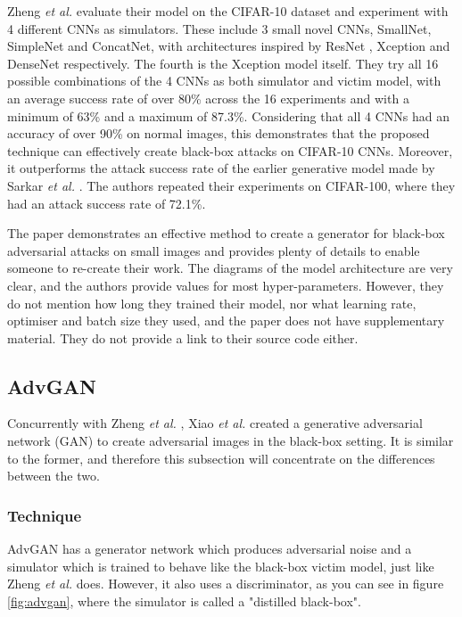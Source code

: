 Zheng \textit{et al.} \cite{zheng_black_box_GAN} evaluate their model on the CIFAR-10 dataset and experiment with 4 different CNNs as simulators. These include 3 small novel CNNs, SmallNet, SimpleNet and ConcatNet, with architectures inspired by ResNet \cite{resnet}, Xception \cite{xception} and DenseNet \cite{densenet} respectively. The fourth is the Xception model \cite{xception} itself. They try all 16 possible combinations of the 4 CNNs as both simulator and victim model, with an average success rate of over 80\% across the 16 experiments and with a minimum of 63\% and a maximum of 87.3\%. Considering that all 4 CNNs had an accuracy of over 90\% on normal images, this demonstrates that the proposed technique can effectively create black-box attacks on CIFAR-10 CNNs. Moreover, it outperforms the attack success rate of the earlier generative model made by Sarkar \textit{et al.} \cite{upset_angri}. The authors repeated their experiments on CIFAR-100, where they had an attack success rate of 72.1\%.

The paper demonstrates an effective method to create a generator for black-box adversarial attacks on small images and provides plenty of details to enable someone to re-create their work. The diagrams of the model architecture are very clear, and the authors provide values for most hyper-parameters. However, they do not mention how long they trained their model, nor what learning rate, optimiser and batch size they used, and the paper does not have supplementary material. They do not provide a link to their source code either.

\subsection{AdvGAN}
    \label{subsec:AdvGAN}
    
Concurrently with Zheng \textit{et al.} \cite{zheng_black_box_GAN}, Xiao \textit{et al.} \cite{advGAN} created a generative adversarial network (GAN) to create adversarial images in the black-box setting. It is similar to the former, and therefore this subsection will concentrate on the differences between the two.

\subsubsection{Technique}

AdvGAN has a generator network which produces adversarial noise and a simulator which is trained to behave like the black-box victim model, just like Zheng \textit{et al.} does. However, it also uses a discriminator, as you can see in figure \ref{fig:advgan}, where the simulator is called a "distilled black-box". 

